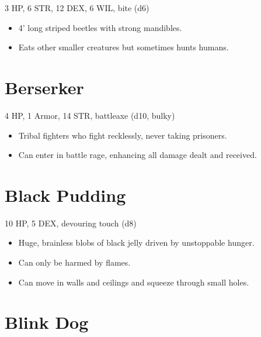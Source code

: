 \documentclass[
  10pt,
  american,
]{article}
\begin{document}
3 HP, 6 STR, 12 DEX, 6 WIL, bite (d6)

\begin{samepage}
\begin{itemize}
\setlength\itemsep{-.5em}
\item 4’ long striped beetles with strong mandibles.
\item Eats other smaller creatures but sometimes hunts humans.
\end{itemize}
\end{samepage}

\hypertarget{berserker}{%
\section{Berserker}\label{berserker}}

4 HP, 1 Armor, 14 STR, battleaxe (d10, bulky)

\begin{samepage}
\begin{itemize}
\setlength\itemsep{-.5em}
\item Tribal fighters who fight recklessly, never taking prisoners.
\item Can enter in battle rage, enhancing all damage dealt and received.
\end{itemize}
\end{samepage}

\hypertarget{black-pudding}{%
\section{Black Pudding}\label{black-pudding}}

10 HP, 5 DEX, devouring touch (d8)

\begin{samepage}
\begin{itemize}
\setlength\itemsep{-.5em}
\item Huge, brainless blobs of black jelly driven by unstoppable hunger.
\item Can only be harmed by flames.
\item Can move in walls and ceilings and squeeze through small holes.
\end{itemize}
\end{samepage}

\hypertarget{blink-dog}{%
\section{Blink Dog}\label{blink-dog}}
\end{document}
